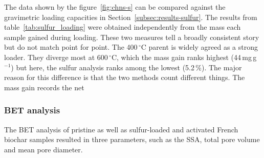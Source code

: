 The data shown by the figure~\ref{fig:chns-s} can be compared against the gravimetric loading capacities in Section~\ref{subsec:results-sulfur}. The results from table~\ref{tab:sulfur_loading} were obtained independently from the mass each sample gained during loading. These two measures tell a broadly consistent story but do not match point for point. The 400\,$^{\circ}$C parent is widely agreed as a strong loader. They diverge most at 600\,$^{\circ}$C, which the mass gain ranks highest (44\,mg\,g$^{-1}$) but here, the sulfur analysis ranks among the lowest (5.2\,\%). The major reason for this difference is that the two methods count different things. The mass gain records the net












\newpage
\subsubsection{BET analysis}

The BET analysis of pristine as well as sulfur-loaded and activated French biochar samples resulted in three parameters, such as the SSA, total pore volume and mean pore diameter.  

